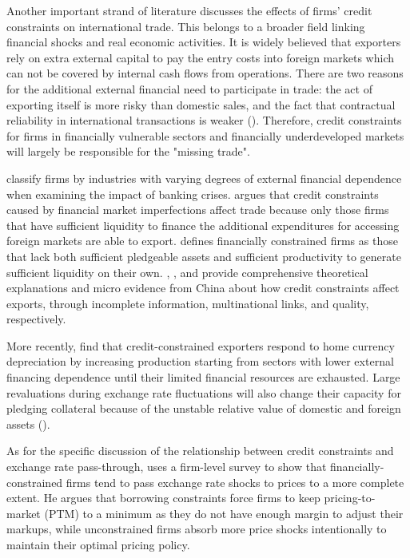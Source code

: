 Another important strand of literature discusses the effects of firms' credit constraints on international trade. This belongs to a broader field linking financial shocks and real economic activities. It is widely believed that exporters rely on extra external capital to pay the entry costs into foreign markets which can not be covered by internal cash flows from operations. There are two reasons for the additional external financial need to participate in trade: the act of exporting itself is more risky than domestic sales, and the fact that contractual reliability in international transactions is weaker (\cite{chaney2016}). Therefore, credit constraints for firms in financially vulnerable sectors and financially underdeveloped markets will largely be responsible for the "missing trade".

\cite{kroszner2007} classify firms by industries with varying degrees of external financial dependence when examining the impact of banking crises. \cite{manova2013} argues that credit constraints caused by financial market imperfections affect trade because only those firms that have sufficient liquidity to finance the additional expenditures for accessing foreign markets are able to export. \cite{chaney2016} defines financially constrained firms as those that lack both sufficient pledgeable assets and sufficient productivity to generate sufficient liquidity on their own. \cite{feenstra-li-yu2014}, \cite{manova-wei-zhang2015}, and \cite{fan-lai-li2015} provide comprehensive theoretical explanations and micro evidence from China about how credit constraints affect exports, through incomplete information, multinational links, and quality, respectively.

More recently, \cite{li-lan-ouyang2020} find that credit-constrained exporters respond to home currency depreciation by increasing production starting from sectors with lower external financing dependence until their limited financial resources are exhausted. Large revaluations during exchange rate fluctuations will also change their capacity for pledging collateral because of the unstable relative value of domestic and foreign assets (\cite{kohn2020}). 

As for the specific discussion of the relationship between credit constraints and exchange rate pass-through, \cite{strasser2013} uses a firm-level survey to show that financially-constrained firms tend to pass exchange rate shocks to prices to a more complete extent. He argues that borrowing constraints force firms to keep pricing-to-market (PTM) to a minimum as they do not have enough margin to adjust their markups, while unconstrained firms absorb more price shocks intentionally to maintain their optimal pricing policy. 

